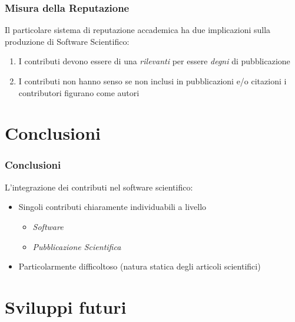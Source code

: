 \begin{frame}\frametitle{Misura della Reputazione}

\Large{Il particolare sistema di reputazione accademica ha due implicazioni sulla produzione di Software Scientifico:}

\begin{enumerate}[<+->]
\def\labelenumi{\arabic{enumi}.}
\itemsep1pt\parskip0pt
\item
  I contributi devono essere di una \emph{rilevanti} per essere
  \emph{degni} di pubblicazione
\item
  I contributi non hanno senso se non inclusi in pubblicazioni e/o
  citazioni i contributori figurano come autori
\end{enumerate}

\end{frame}

\section{Conclusioni}

\begin{frame}\frametitle{Conclusioni}

\Large{L'integrazione dei contributi nel software scientifico:}

\begin{itemize}[<+->]
\itemsep1pt\parskip0pt
\item
  Singoli contributi chiaramente individuabili a livello

  \begin{itemize}[<+->]
  \itemsep1pt\parskip0pt
  \item
    \emph{Software}
  \item
    \emph{Pubblicazione Scientifica}
  \end{itemize}
\item
  Particolarmente difficoltoso (natura statica degli articoli
  scientifici)
\end{itemize}

\end{frame}

\section{Sviluppi futuri}

